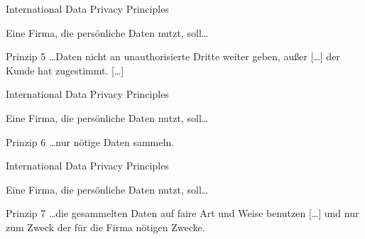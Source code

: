\begin{frame}{International Data Privacy Principles}


    Eine Firma, die persönliche Daten nutzt, soll\dots

    \begin{block}{Prinzip 5 \cite{zankl_international_2014}}
        \dots Daten nicht an unauthorisierte Dritte weiter geben, außer [\dots] der Kunde hat zugestimmt. [\dots] 
    \end{block}


\end{frame}

\begin{frame}{International Data Privacy Principles}


    Eine Firma, die persönliche Daten nutzt, soll\dots

    \begin{block}{Prinzip 6 \cite{zankl_international_2014}}
        \dots nur nötige Daten sammeln.
    \end{block}


\end{frame}

\begin{frame}{International Data Privacy Principles}

    Eine Firma, die persönliche Daten nutzt, soll\dots

    \begin{block}{Prinzip 7 \cite{zankl_international_2014}}
        \dots die gesammelten Daten auf faire Art und Weise benutzen [\dots] und nur zum Zweck der für die Firma nötigen Zwecke.
    \end{block}


\end{frame}

